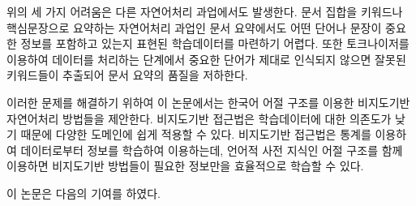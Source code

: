 \documentclass[11pt]{article}
\begin{document}
위의 세 가지 어려움은 다른 자연어처리 과업에서도 발생한다.
문서 집합을 키워드나 핵심문장으로 요약하는 자연어처리 과업인 문서 요약에서도 어떤 단어나 문장이 중요한 정보를 포함하고 있는지 표현된 학습데이터를 마련하기 어렵다.
또한 토크나이저를 이용하여 데이터를 처리하는 단계에서 중요한 단어가 제대로 인식되지 않으면 잘못된 키워드들이 추출되어 문서 요약의 품질을 저하한다.

이러한 문제를 해결하기 위하여 이 논문에서는 한국어 어절 구조를 이용한 비지도기반 자연어처리 방법들을 제안한다.
비지도기반 접근법은 학습데이터에 대한 의존도가 낮기 때문에 다양한 도메인에 쉽게 적용할 수 있다.
비지도기반 접근법은 통계를 이용하여 데이터로부터 정보를 학습하여 이용하는데, 언어적 사전 지식인 어절 구조를 함께 이용하면 비지도기반 방법들이 필요한 정보만을 효율적으로 학습할 수 있다.

이 논문은 다음의 기여를 하였다.
\end{document}
